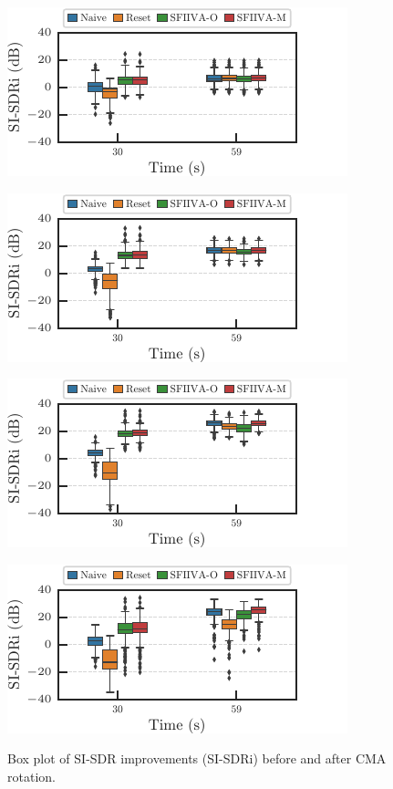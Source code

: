 \documentclass[sip,biber]{now-journal}
\begin{document}
\begin{figure}[t]
  \begin{minipage}[t]{.45\textwidth}
    \centering\includegraphics{figures/plots/online/box_900.pdf}\label{fig:plot:box:900}
  \end{minipage}
  \begin{minipage}[t]{.45\textwidth}
    \centering\includegraphics{figures/plots/online/box_950.pdf}\label{fig:plot:box:950}
  \end{minipage}
  \vspace{.5em}

  \begin{minipage}[t]{.45\textwidth}
    \centering\includegraphics{figures/plots/online/box_980.pdf}\label{fig:plot:box:980}
  \end{minipage}
  \begin{minipage}[t]{.45\textwidth}
    \centering\includegraphics{figures/plots/online/box_990.pdf}\label{fig:plot:box:990}
  \end{minipage}
  \caption{Box plot of SI-SDR improvements (SI-SDRi) before and after CMA rotation.}%
  \label{fig:plot:box}
\end{figure}
\end{document}
